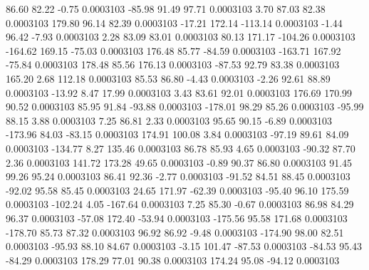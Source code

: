        86.60       82.22       -0.75     0.0003103
      -85.98       91.49       97.71     0.0003103
        3.70       87.03       82.38     0.0003103
      179.80       96.14       82.39     0.0003103
      -17.21      172.14     -113.14     0.0003103
       -1.44       96.42       -7.93     0.0003103
        2.28       83.09       83.01     0.0003103
       80.13      171.17     -104.26     0.0003103
     -164.62      169.15      -75.03     0.0003103
      176.48       85.77      -84.59     0.0003103
     -163.71      167.92      -75.84     0.0003103
      178.48       85.56      176.13     0.0003103
      -87.53       92.79       83.38     0.0003103
      165.20        2.68      112.18     0.0003103
       85.53       86.80       -4.43     0.0003103
       -2.26       92.61       88.89     0.0003103
      -13.92        8.47       17.99     0.0003103
        3.43       83.61       92.01     0.0003103
      176.69      170.99       90.52     0.0003103
       85.95       91.84      -93.88     0.0003103
     -178.01       98.29       85.26     0.0003103
      -95.99       88.15        3.88     0.0003103
        7.25       86.81        2.33     0.0003103
       95.65       90.15       -6.89     0.0003103
     -173.96       84.03      -83.15     0.0003103
      174.91      100.08        3.84     0.0003103
      -97.19       89.61       84.09     0.0003103
     -134.77        8.27      135.46     0.0003103
       86.78       85.93        4.65     0.0003103
      -90.32       87.70        2.36     0.0003103
      141.72      173.28       49.65     0.0003103
       -0.89       90.37       86.80     0.0003103
       91.45       99.26       95.24     0.0003103
       86.41       92.36       -2.77     0.0003103
      -91.52       84.51       88.45     0.0003103
      -92.02       95.58       85.45     0.0003103
       24.65      171.97      -62.39     0.0003103
      -95.40       96.10      175.59     0.0003103
     -102.24        4.05     -167.64     0.0003103
        7.25       85.30       -0.67     0.0003103
       86.98       84.29       96.37     0.0003103
      -57.08      172.40      -53.94     0.0003103
     -175.56       95.58      171.68     0.0003103
     -178.70       85.73       87.32     0.0003103
       96.92       86.92       -9.48     0.0003103
     -174.90       98.00       82.51     0.0003103
      -95.93       88.10       84.67     0.0003103
       -3.15      101.47      -87.53     0.0003103
      -84.53       95.43      -84.29     0.0003103
      178.29       77.01       90.38     0.0003103
      174.24       95.08      -94.12     0.0003103
